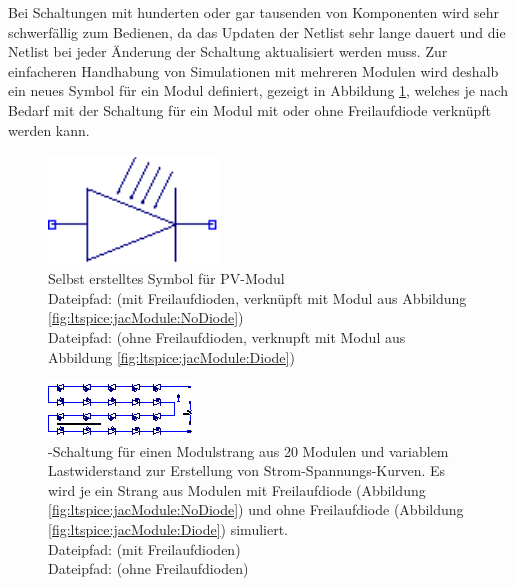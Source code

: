 \clearpage
Bei  Schaltungen  mit  hunderten  oder  gar  tausenden  von  Komponenten  wird
 sehr  schwerf\"allig zum Bedienen,  da das Updaten  der Netlist
sehr  lange  dauert   und  die  Netlist bei  jeder  \"Anderung  der  Schaltung
aktualisiert  werden muss.   Zur einfacheren  Handhabung von  Simulationen mit
mehreren  Modulen wird  deshalb ein  neues Symbol  f\"ur ein  Modul definiert,
gezeigt in  Abbildung \ref{fig:ltspice:module:symbol}, welches je  nach Bedarf
mit  der Schaltung  f\"ur ein  Modul mit  oder ohne  Freilaufdiode verkn\"upft
werden kann.

\begin{figure}[h!tb]
    \centering
    \includegraphics[width=0.4\textwidth]{images/ltspice/module-symbol.eps}
    \caption{%
        Selbst erstelltes Symbol f\"ur PV-Modul\protect\\
        Dateipfad:      (mit   Freilaufdioden,
        verkn\"upft          mit          Modul         aus          Abbildung
        \ref{fig:ltspice:jacModule:NoDiode})\protect\\
        Dateipfad:  (ohne Freilaufdioden, verknupft mit
        Modul aus Abbildung \ref{fig:ltspice:jacModule:Diode})%
    }
    \label{fig:ltspice:module:symbol}
\end{figure}

\begin{figure}[h!tb]
    \centering
    \includegraphics[width=\textwidth]{images/ltspice/jac/stringNoD.eps}
    \caption[-Schaltung f\"ur Modulstrang]{%
        -Schaltung  f\"ur  einen   Modulstrang  aus  20  Modulen
        und   variablem  Lastwiderstand      zur  Erstellung   von
        Strom-Spannungs-Kurven. Es  wird   je  ein  Strang  aus   Modulen  mit
        Freilaufdiode   (Abbildung  \ref{fig:ltspice:jacModule:NoDiode})   und
        ohne   Freilaufdiode   (Abbildung   \ref{fig:ltspice:jacModule:Diode})
        simuliert.\protect\\
        Dateipfad:  (mit Freilaufdioden)\protect\\
        Dateipfad:  (ohne Freilaufdioden)%
    }
    \label{fig:ltspice:string:ivCurve}
\end{figure}

